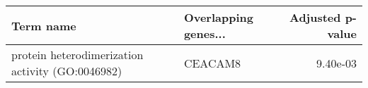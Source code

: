 \begin{tabular}{llr}
\toprule
                                       Term name & Overlapping genes... &  Adjusted p-value \\
\midrule
protein heterodimerization activity (GO:0046982) &              CEACAM8 &          9.40e-03 \\
\bottomrule
\end{tabular}
